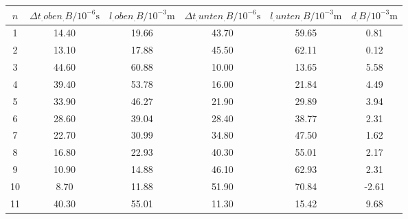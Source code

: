 \label{tab:tabBScan}
	\begin{tabular}{S[table-format=1.0]S[table-format=2.2]S[table-format=2.2]S[table-format=2.2]S[table-format=2.2]S[table-format=2.2]}
		\toprule
		{$n$} & {$\Delta t_.{oben_.{B} }/10^{-6}\si{\second}$} & {$l_.{oben_.{B}}/10^{-3}\si{\metre}$} & {$\Delta t_.{unten_.{B}}/10^{-6}\si{\second}$} & {$l_.{unten_.{B}}/10^{-3}\si{\metre}$} & {$d_.{B}/10^{-3}\si{\metre}$} \\
		 & 14.40 & 19.66 & 43.70 & 59.65 & 0.81 \\
		2 & 13.10 & 17.88 & 45.50 & 62.11 & 0.12 \\
		3 & 44.60 & 60.88 & 10.00 & 13.65 & 5.58 \\
		4 & 39.40 & 53.78 & 16.00 & 21.84 & 4.49 \\
		5 & 33.90 & 46.27 & 21.90 & 29.89 & 3.94 \\
		6 & 28.60 & 39.04 & 28.40 & 38.77 & 2.31 \\
		7 & 22.70 & 30.99 & 34.80 & 47.50 & 1.62 \\
		8 & 16.80 & 22.93 & 40.30 & 55.01 & 2.17 \\
		9 & 10.90 & 14.88 & 46.10 & 62.93 & 2.31 \\
		10 & 8.70 & 11.88 & 51.90 & 70.84 & -2.61 \\
		11 & 40.30 & 55.01 & 11.30 & 15.42 & 9.68 \\
		\bottomrule
	\end{tabular}
